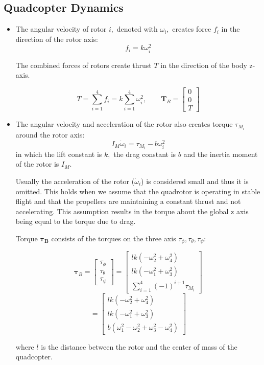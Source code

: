 \subsection{Quadcopter Dynamics}
\begin{itemize}
  \item The angular velocity of rotor $i,$ denoted with $\omega_{i},$ creates force $f_{i}$ in the direction of
the rotor axis: 
$$f_{i}=k \omega_{i}^{2}$$

The combined forces of rotors create thrust $T$ in the direction of the body z-axis.

$$T=\sum_{i=1}^{4} f_{i}=k \sum_{i=1}^{4} \omega_{i}^{2}, \quad \quad \boldsymbol{T}_{B}=\left[ \begin{array}{c}{0} \\ {0} \\ {T}\end{array}\right]$$

  \item The angular velocity and acceleration of the rotor also creates torque $\tau_{M_i}$ around the rotor axis: 
  $$I_{M} \dot{\omega}_{i} = \tau_{M_{i}} - b \omega_{i}^{2}$$
  in which the lift constant is $k,$ the drag constant is $b$ and the inertia moment of the
rotor is $I_{M}$. 

Usually the acceleration of the rotor ($\dot{\omega}_{i}$) is considered small and thus it is omitted.
  This holds when we assume that the quadrotor is operating in stable flight and that the propellers are maintaining a constant thrust and not accelerating.
  This assumption results in the torque about the global z axis being equal to the torque due to drag.

Torque $\boldsymbol{\tau_B}$ consists of the torques on the three axis $\tau_\phi, \tau_\theta, \tau_\psi$:

$$
\boldsymbol{\tau}_{B}=\left[ \begin{array}{c}{\tau_{\phi}} \\ {\tau_{\theta}} \\ {\tau_{\psi}}\end{array}\right]=
\left[ \begin{array}{c}{l k\left(-\omega_{2}^{2}+\omega_{4}^{2}\right)} \\ {l k\left(-\omega_{1}^{2}+\omega_{3}^{2}\right)} \\ {\sum_{i=1}^{4} (-1)^{i+1} \tau_{M_{i}}}\end{array}\right]
  $$
  $$
  =
\left[ \begin{array}{c}
{l k\left(-\omega_{2}^{2}+\omega_{4}^{2}\right)} \\
{l k\left(-\omega_{1}^{2}+\omega_{3}^{2}\right)} \\
{b(\omega_{1}^{2}-\omega_{2}^{2}+\omega_{3}^{2}-\omega_{4}^{2})}\end{array}\right]
  $$

where $l$ is the distance between the rotor and the center of mass of the quadcopter.

\end{itemize}


